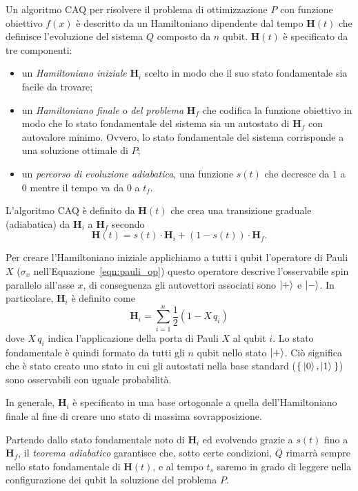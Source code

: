 Un algoritmo CAQ per risolvere il problema di ottimizzazione $P$ con funzione obiettivo $f(x)$ è descritto da un Hamiltoniano dipendente dal tempo $\mathbf{H}(t)$ che definisce l'evoluzione del sistema $Q$ composto da $n$ qubit. $\mathbf{H}(t)$ è specificato da tre componenti:
\begin{itemize}
	\item un \emph{Hamiltoniano iniziale} $\mathbf{H}_i$ scelto in modo che il suo stato fondamentale sia facile da trovare;
	\item un \emph{Hamiltoniano finale} o \emph{del problema} $\mathbf{H}_f$ che codifica la funzione obiettivo in modo che lo stato fondamentale del sistema sia un autostato di $\mathbf{H}_f$ con autovalore minimo. Ovvero, lo stato fondamentale del sistema corrisponde a una soluzione ottimale di $P$;
	\item un \emph{percorso di evoluzione adiabatica}, una funzione $s(t)$ che decresce da $1$ a $0$ mentre il tempo va da $0$ a $t_f$.
\end{itemize}
L'algoritmo CAQ è definito da $\mathbf{H}(t)$ che crea una transizione graduale (adiabatica) da $\mathbf{H}_i$ a $\mathbf{H}_f$ secondo
\begin{equation}
	\mathbf{H}(t) = s(t) \cdot \mathbf{H}_i +(1-s(t)) \cdot \mathbf{H}_f.
\end{equation}

Per creare l'Hamiltoniano iniziale applichiamo a tutti i qubit l'operatore di Pauli $X$ ($\sigma_x$ nell'Equazione~\ref{eqn:pauli_op}) \textemdash{}questo operatore descrive l'osservabile spin parallelo all'asse $x$, di conseguenza\textemdash{} gli autovettori associati sono $\Ket{+}$ e $\Ket{-}$. In particolare, $\mathbf{H}_i$ è definito come
\[
\mathbf{H}_i = \sum_{i = 1}^{n} \frac{1}{2} (1 - X\,q_i)
\]
dove $X\,q_i$ indica l'applicazione della porta di Pauli $X$ al qubit $i$. Lo stato fondamentale è quindi formato da tutti gli $n$ qubit nello stato $\Ket{+}$. Ciò significa che è stato creato uno stato in cui gli autostati nella base standard ($\Set{\Ket{0}, \Ket{1}}$) sono osservabili con uguale probabilità.

In generale, $\mathbf{H}_i$ è specificato in una base ortogonale a quella dell'Hamiltoniano finale al fine di creare uno stato di massima sovrapposizione.

Partendo dallo stato fondamentale noto di $\mathbf{H}_i$ ed evolvendo grazie a $s(t)$ fino a $\mathbf{H}_f$, il \emph{teorema adiabatico} garantisce che, sotto certe condizioni, $Q$ rimarrà sempre nello stato fondamentale di $\mathbf{H}(t)$, e al tempo $t_s$ saremo in grado di leggere nella configurazione dei qubit la soluzione del problema $P$.

